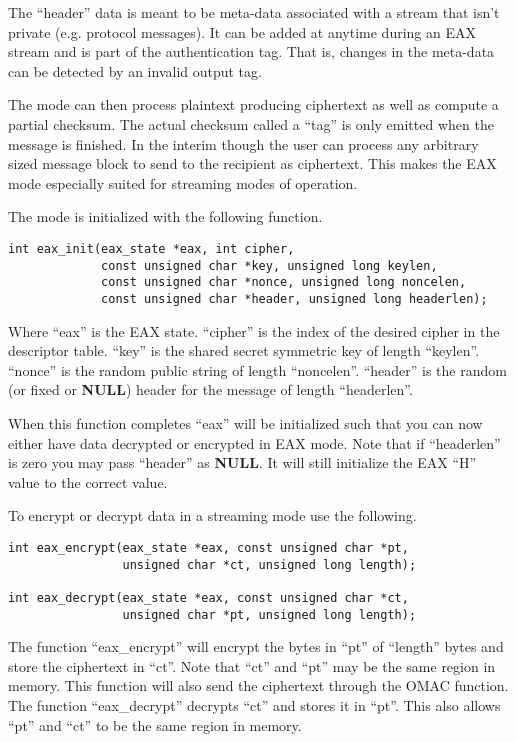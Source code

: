 \documentclass[b5paper]{book}
\begin{document}
The ``header'' data is meant to be meta-data associated with a stream that isn't private (e.g. protocol messages).  It can
be added at anytime during an EAX stream and is part of the authentication tag.  That is, changes in the meta-data can
be detected by an invalid output tag.

The mode can then process plaintext producing ciphertext as well as compute a partial checksum.  The actual checksum
called a ``tag'' is only emitted when the message is finished.  In the interim though the user can process any arbitrary
sized message block to send to the recipient as ciphertext.  This makes the EAX mode especially suited for streaming modes
of operation.

The mode is initialized with the following function.
\begin{verbatim}
int eax_init(eax_state *eax, int cipher, 
             const unsigned char *key, unsigned long keylen,
             const unsigned char *nonce, unsigned long noncelen,
             const unsigned char *header, unsigned long headerlen);
\end{verbatim}

Where ``eax'' is the EAX state.  ``cipher'' is the index of the desired cipher in the descriptor table.  
``key'' is the shared secret symmetric key of length ``keylen''.  ``nonce'' is the random public string of
length ``noncelen''.  ``header'' is the random (or fixed or \textbf{NULL}) header for the message of length
``headerlen''.

When this function completes ``eax'' will be initialized such that you can now either have data decrypted or 
encrypted in EAX mode.  Note that if ``headerlen'' is zero you may pass ``header'' as \textbf{NULL}.  It will still
initialize the EAX ``H'' value to the correct value.  

To encrypt or decrypt data in a streaming mode use the following.
\begin{verbatim}
int eax_encrypt(eax_state *eax, const unsigned char *pt, 
                unsigned char *ct, unsigned long length);

int eax_decrypt(eax_state *eax, const unsigned char *ct, 
                unsigned char *pt, unsigned long length);
\end{verbatim}
The function ``eax\_encrypt'' will encrypt the bytes in ``pt'' of ``length'' bytes and store the ciphertext in
``ct''.  Note that ``ct'' and ``pt'' may be the same region in memory.   This function will also send the ciphertext
through the OMAC function.  The function ``eax\_decrypt'' decrypts ``ct'' and stores it in ``pt''.  This also allows 
``pt'' and ``ct'' to be the same region in memory.  
\end{document}
